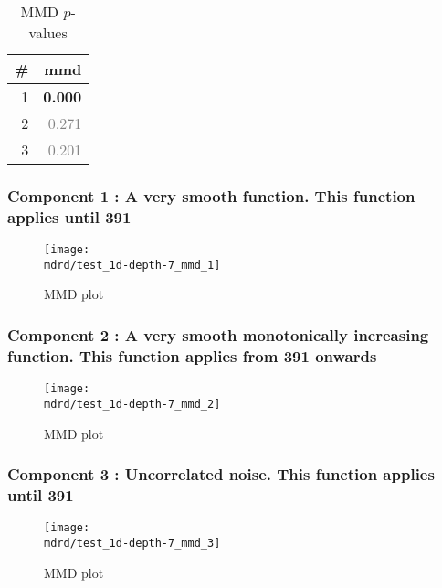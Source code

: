 \documentclass{article} %
\begin{document}
\begin{table}[htb]
\begin{center}
{\small
\begin{tabular}{|r|r|}
\hline
\bf{\#} & {mmd}\\
\hline

1 & \textbf{0.000}\\

2 & \textcolor{gray}{0.271}\\

3 & \textcolor{gray}{0.201}\\

\hline
\end{tabular}
\caption{
MMD $p$-values
}
\label{table:mmd}
}
\end{center}
\end{table}

\subsubsection{Component 1 : A very smooth function. This function applies until  391}

\begin{figure}[H]
\newcommand{\wmgd}{0.5\columnwidth}
\newcommand{\hmgd}{3.0cm}
\newcommand{\mdrd}{test_1d-depth-7}
\newcommand{\mbm}{\hspace{-0.3cm}}
\texttt{[image: \\mdrd/test\_1d-depth-7\_mmd\_1]}
\caption{
MMD plot}
\label{fig:mmd1}
\end{figure}

\subsubsection{Component 2 : A very smooth monotonically increasing function. This function applies from  391 onwards}

\begin{figure}[H]
\newcommand{\wmgd}{0.5\columnwidth}
\newcommand{\hmgd}{3.0cm}
\newcommand{\mdrd}{test_1d-depth-7}
\newcommand{\mbm}{\hspace{-0.3cm}}
\texttt{[image: \\mdrd/test\_1d-depth-7\_mmd\_2]}
\caption{
MMD plot}
\label{fig:mmd2}
\end{figure}

\subsubsection{Component 3 : Uncorrelated noise. This function applies until  391}

\begin{figure}[H]
\newcommand{\wmgd}{0.5\columnwidth}
\newcommand{\hmgd}{3.0cm}
\newcommand{\mdrd}{test_1d-depth-7}
\newcommand{\mbm}{\hspace{-0.3cm}}
\texttt{[image: \\mdrd/test\_1d-depth-7\_mmd\_3]}
\caption{
MMD plot}
\label{fig:mmd3}
\end{figure}
\end{document}
